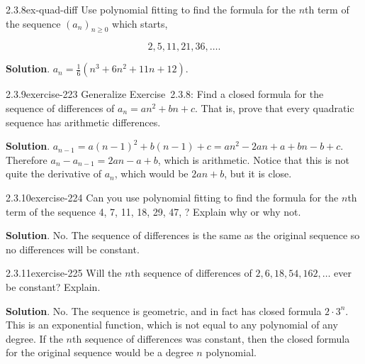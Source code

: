 \documentclass[twoside,11pt,]{book}
\numberwithin{equation}{chapter}
\begin{document}
\begin{divisionsolution}{2.3.8}{}{ex-quad-diff}%
\hypertarget{p-3351}{}%
Use polynomial fitting to find the formula for the \(n\)th term of the sequence \((a_n)_{n \ge 0}\) which starts,%
\par
\hypertarget{p-3352}{}%
%
\begin{equation*}
2,5,11,21,36, \ldots 
\text{.}
\end{equation*}
%
\par\smallskip%
\noindent\textbf{Solution}.\quad%
\hypertarget{p-3353}{}%
\(a_n = \frac{1}{6} (n^3 + 6n^2 + 11n + 12)\text{.}\)%
\end{divisionsolution}%
\begin{divisionsolution}{2.3.9}{}{exercise-223}%
\hypertarget{p-3354}{}%
Generalize Exercise~2.3.8: Find a closed formula for the sequence of differences of \(a_n = an^2 + bn + c\). That is, prove that every quadratic sequence has arithmetic differences.%
\par\smallskip%
\noindent\textbf{Solution}.\quad%
\hypertarget{p-3355}{}%
\(a_{n-1} = a(n-1)^2 + b(n-1) + c = an^2 - 2an + a + bn - b + c\). Therefore \(a_n - a_{n-1} = 2an - a + b\), which is arithmetic. Notice that this is not quite the derivative of \(a_n\), which would be \(2an + b\), but it is close.%
\end{divisionsolution}%
\begin{divisionsolution}{2.3.10}{}{exercise-224}%
\hypertarget{p-3356}{}%
Can you use polynomial fitting to find the formula for the \(n\)th term of the sequence 4, 7, 11, 18, 29, 47, \textellipsis{}? Explain why or why not.%
\par\smallskip%
\noindent\textbf{Solution}.\quad%
\hypertarget{p-3357}{}%
No. The sequence of differences is the same as the original sequence so no differences will be constant.%
\end{divisionsolution}%
\begin{divisionsolution}{2.3.11}{}{exercise-225}%
\hypertarget{p-3358}{}%
Will the \(n\)th sequence of differences of \(2, 6, 18, 54, 162, \ldots\) ever be constant? Explain.%
\par\smallskip%
\noindent\textbf{Solution}.\quad%
\hypertarget{p-3359}{}%
No. The sequence is geometric, and in fact has closed formula \(2\cdot 3^n\). This is an exponential function, which is not equal to any polynomial of any degree. If the \(n\)th sequence of differences was constant, then the closed formula for the original sequence would be a degree \(n\) polynomial.%
\end{divisionsolution}%
\end{document}
